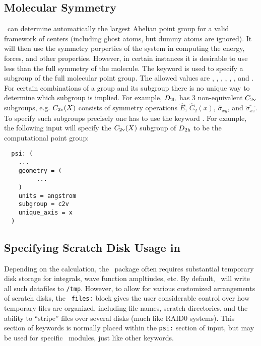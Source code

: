 \subsection{Molecular Symmetry} \label{symm-spec}
\PSIthree\ can determine automatically the largest Abelian point group
for a valid framework of centers (including ghost atoms, but dummy
atoms are ignored).  It will then use the symmetry porperties of the
system in computing the energy, forces, and other properties.
However, in certain instances it is desirable to use less than the
full symmetry of the molecule. The keyword  is used
to specify a subgroup of the full molecular point group. The allowed
values are , , , ,
, , and . For certain combinations
of a group and its subgroup there is no unique way to determine which
subgroup is implied. For example, $D_{\rm 2h}$ has 3 non-equivalent
$C_{\rm 2v}$ subgroups, e.g. $C_{\rm 2v}(X)$ consists of symmetry
operations $\hat{E}$, $\hat{C}_2(x)$, $\hat{\sigma}_{xy}$, and
$\hat{\sigma_{xz}}$.  To specify such subgroups precisely one has to
use the keyword .  For example, the following
input will specify the $C_{\rm 2v}(X)$ subgroup of $D_{\rm 2h}$ to be
the computational point group:
\begin{verbatim}
  psi: (
    ...
    geometry = (
         ...
    )
    units = angstrom
    subgroup = c2v
    unique_axis = x
  )
\end{verbatim}

\subsection{Specifying Scratch Disk Usage in \PSIthree} \label{scratchfiles}

Depending on the calculation, the \PSIthree\ package often requires
substantial temporary disk storage for integrals, wave function
ampltiudes, etc.  By default, \PSIthree\ will write all such datafiles
to {\tt /tmp}.  However, to allow for various customized arrangements
of scratch disks, the \PSIthree\ {\tt files:} block gives the user
considerable control over how temporary files are organized, including
file names, scratch directories, and the ability to ``stripe'' files
over several disks (much like RAID0 systems).  This section of
keywords is normally placed within the {\tt psi:} section of input,
but may be used for specific \PSIthree\ modules, just like other
keywords.

